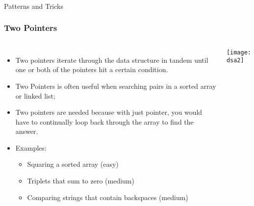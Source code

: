 \begin{frame}[fragile]\frametitle{}
\begin{center}
{\Large Patterns and Tricks}
\end{center}
\end{frame}

\begin{frame}[fragile]
	\frametitle{Two Pointers}
	
	\begin{columns}[T]
			\begin{itemize}
				\item Two pointers iterate through the data structure in tandem until one or both of the pointers hit a certain condition.
				\item Two Pointers is often useful when searching pairs in a sorted array or linked list; 
				\item Two pointers are needed because with just pointer, you would have to continually loop back through the array to find the answer. 
				\item Examples:
			\begin{itemize}
				\item Squaring a sorted array (easy)
				\item Triplets that sum to zero (medium)
				\item Comparing strings that contain backspaces (medium)
			\end{itemize}

			\end{itemize}
			
		
\begin{center}
\texttt{[image: dsa2]}
\end{center}			
	\end{columns}
\end{frame}

